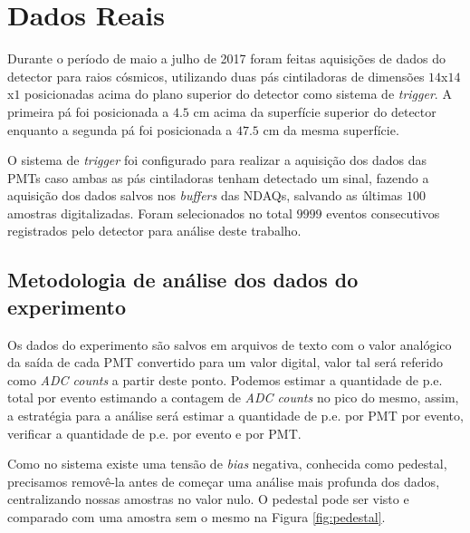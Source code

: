 \chapter{Dados Reais} \label{cap:dadosreais}
\vspace{-2cm}

Durante o período de maio a julho de 2017 foram feitas aquisições de dados do detector para raios cósmicos, utilizando duas pás cintiladoras de dimensões $14$x$14$x$1$ posicionadas acima do plano superior do detector como sistema de \emph{trigger}. A primeira pá foi posicionada a $4.5$ cm acima da superfície superior do detector enquanto a segunda pá foi posicionada a $47.5$ cm da mesma superfície.

O sistema de \emph{trigger} foi configurado para realizar a aquisição dos dados das PMTs caso ambas as pás cintiladoras tenham detectado um sinal, fazendo a aquisição dos dados salvos nos \emph{buffers} das NDAQs, salvando as últimas $100$ amostras digitalizadas. Foram selecionados no total $9999$ eventos consecutivos registrados pelo detector para análise deste trabalho.



\section{Metodologia de análise dos dados do experimento}

Os dados do experimento são salvos em arquivos de texto com o valor analógico da saída de cada PMT convertido para um valor digital, valor tal será referido como \emph{ADC counts} a partir deste ponto. Podemos estimar a quantidade de p.e. total por evento estimando a contagem de  \emph{ADC counts} no pico do mesmo, assim, a estratégia para a análise será estimar a quantidade de p.e. por PMT por evento, verificar a quantidade de p.e. por evento e por PMT.

Como no sistema existe uma tensão de \emph{bias} negativa, conhecida como pedestal, precisamos removê-la antes de começar uma análise mais profunda dos dados, centralizando nossas amostras no valor nulo. O pedestal pode ser visto e comparado com uma amostra sem o mesmo na Figura \ref{fig:pedestal}.

